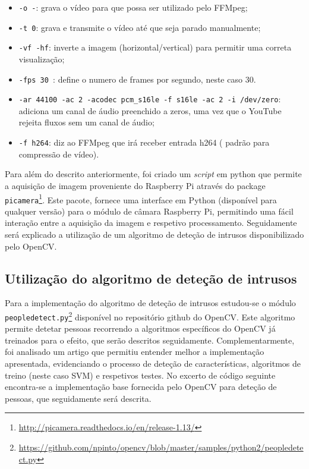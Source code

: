 \begin{itemize}
	\item \texttt{-o -}: grava o vídeo para que possa ser utilizado pelo FFMpeg; 
	
	\item \texttt{-t 0}: grava e transmite o vídeo até que seja parado manualmente; 
	
	\item \texttt{-vf -hf}: inverte a imagem (horizontal/vertical) para permitir uma correta visualização; 
	
	\item \texttt{-fps 30 }: define o numero de frames por segundo, neste caso 30. 
	
	\item \texttt{-ar 44100 -ac 2 -acodec pcm\_s16le -f s16le -ac 2 -i /dev/zero}: adiciona um canal de áudio preenchido a zeros, uma vez que o YouTube rejeita fluxos sem um canal de áudio; 
	
	\item \texttt{-f h264}: diz ao FFMpeg que irá receber entrada h264 ( padrão para compressão de vídeo). 
	
\end{itemize}






Para além do descrito anteriormente, foi criado um \textit{script} em python que permite a aquisição de imagem proveniente do Raspberry Pi através do package \texttt{picamera}\footnote{\url{http://picamera.readthedocs.io/en/release-1.13/}}. Este pacote, fornece  uma interface em Python (disponível para qualquer versão) para o módulo de câmara Raspberry Pi, permitindo uma fácil interação entre a aquisição da imagem e respetivo processamento.
Seguidamente será explicado a utilização de um algoritmo de deteção de intrusos disponibilizado pelo OpenCV. 


 


\subsection{Utilização do algoritmo de deteção de intrusos}
\label{algdetecao}


Para a implementação do algoritmo de deteção de intrusos estudou-se o módulo \texttt{peopledetect.py}\footnote{\url{https://github.com/npinto/opencv/blob/master/samples/python2/peopledetect.py}} disponível no repositório github do OpenCV. Este algoritmo permite detetar pessoas recorrendo a algoritmos específicos do OpenCV já treinados para o efeito, que serão descritos seguidamente. Complementarmente, foi analisado um artigo\cite{Dalal} que permitiu entender melhor a implementação apresentada, evidenciando o processo de deteção de características, algoritmos de treino (neste caso \ac{SVM}) e respetivos testes. No excerto de código seguinte encontra-se a implementação base fornecida pelo OpenCV para deteção de pessoas, que seguidamente será descrita. 

